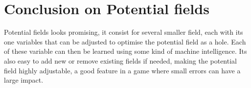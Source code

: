 \section{Conclusion on Potential fields}
	Potential fields looks promising, it consist for several smaller field, each with its one variables that can be adjusted to optimise the potential field as a hole. Each of these variable can then be learned using some kind of machine intelligence. Its also easy to add new or remove existing fields if needed, making the potential field highly adjustable, a good feature in a game where small errors can have a large impact.